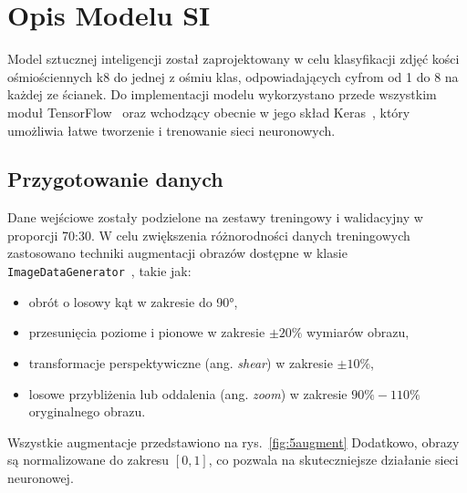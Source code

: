 \section{Opis Modelu SI}\label{sec:opis-modelu-si}

Model sztucznej inteligencji został zaprojektowany w celu klasyfikacji zdjęć kości ośmiościennych k8 do jednej z ośmiu klas,
odpowiadających cyfrom od 1 do 8 na każdej ze ścianek.
Do implementacji modelu wykorzystano przede wszystkim moduł TensorFlow~\cite{tensorflow_docs}
oraz wchodzący obecnie w jego skład Keras~\cite{keras_docs},
który umożliwia łatwe tworzenie i trenowanie sieci neuronowych.




\subsection{Przygotowanie danych}\label{subsec:przygotowanie-danych}

Dane wejściowe zostały podzielone na zestawy treningowy i walidacyjny w proporcji 70:30.
W celu zwiększenia różnorodności danych treningowych zastosowano techniki augmentacji obrazów dostępne w klasie
\texttt{ImageDataGenerator}~\cite{keras_imagedatagenerator}, takie jak:

\begin{itemize}
    \item obrót o losowy kąt w zakresie do 90°,
    \item przesunięcia poziome i pionowe w zakresie $\pm 20\%$ wymiarów obrazu,
    \item transformacje perspektywiczne (ang. \textit{shear}) w zakresie $\pm 10\%$,
    \item losowe przybliżenia lub oddalenia (ang. \textit{zoom}) w zakresie $90\%-110\%$ oryginalnego obrazu.
\end{itemize}

Wszystkie augmentacje przedstawiono na rys.~\ref{fig:5augment}
Dodatkowo, obrazy są normalizowane do zakresu $[0, 1]$, co pozwala na skuteczniejsze działanie sieci neuronowej.


